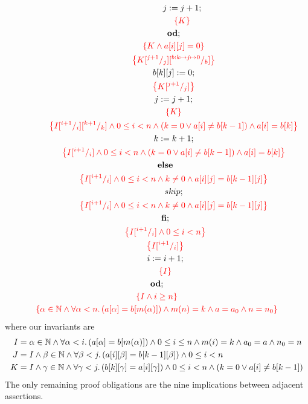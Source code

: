 \documentclass[a4paper,12pt,fleqn]{scrartcl}
\newcommand{\assn}[1]{{\color{red}\left\{#1\right\}}}
\begin{document}
\begin{gather*}
   \qquad \qquad \qquad j\Ass j+1;\\
   \qquad \qquad \qquad \assn{K}\\
   \qquad \qquad \OD;\\
   \qquad \qquad \assn{K\And a[i][j]=0}\\
   \qquad \qquad \assn{K\subst{j+1}j \subst{b:k\mapsto j\mapsto0}b}\\
   \qquad \qquad b[k][j]\Ass 0;\\
   \qquad \qquad \assn{K\subst{j+1}j}\\
   \qquad \qquad j\Ass j+1;\\
   \qquad \qquad \assn{K}\\
   \qquad \qquad \assn{I\subst{i+1}i\subst{k+1}k\And 0\leq i<n\And (k=0\Or a[i]\neq b[k-1])\And a[i]=b[k]}\\
   \qquad \qquad k\Ass k+1;\\
   \qquad \qquad \assn{I\subst{i+1}i\And 0\leq i<n\And (k=0\Or a[i]\neq b[k-1])\And a[i]=b[k]}\\
   \qquad \ELSE\\
   \qquad \qquad \assn{I\subst{i+1}i\And 0\leq i<n\And k\neq0\And a[i][j]=b[k-1][j]}\\
   \qquad \qquad skip;\\
   \qquad \qquad \assn{I\subst{i+1}i\And 0\leq i<n\And k\neq0 \And a[i][j]=b[k-1][j]}\\
   \qquad \FI;\\
   \qquad \assn{I\subst{i+1}i\And 0\leq i<n}\\
   \qquad \assn{I\subst{i+1}i}\\
   \qquad i\Ass i+1;\\
   \qquad \assn{I}\\
   \OD;\\
   \assn{I\And i\geq n}\\
   \assn{\alpha \in \nat \And \All{\alpha<n.}{a[\alpha]=b[m(\alpha)]} \And m(n)=k \And a=a_0 \And n=n_0}
\end{gather*}
where our invariants are
\begin{align*}
  I &= \alpha \in \mathbb{N} \wedge \forall \alpha<i.\left(a[\alpha]=b[m(\alpha)]\right)\wedge 0\leq i\leq n\wedge m(i)=k\wedge a_0=a\wedge n_0=n\\
  J &= I\wedge \beta \in \mathbb{N} \wedge \forall \beta<j.\left(a[i][\beta]=b[k-1][\beta]\right)\wedge 0\leq i<n\\
  K &= I\wedge \gamma \in \mathbb{N} \wedge \forall \gamma<j.\left(b[k][\gamma]=a[i][\gamma]\right)\wedge 0\leq i<n\wedge(k=0\vee a[i]\neq b[k-1])
\end{align*}
The only remaining proof obligations are the nine implications between adjacent assertions.
\end{document}
